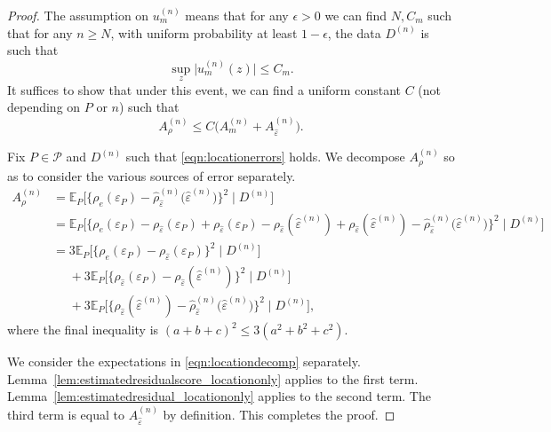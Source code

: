 \documentclass[aos]{imsart}
\newcommand{\E}{\mathbb{E}}
\begin{document}
	\begin{proof}
		The assumption on $u_m^{(n)}$ means that for any $\epsilon > 0$ we can find $N, C_m$ such that for any $n\geq N$, with uniform probability at least $1-\epsilon$, the data $D^{(n)}$ is such that \begin{equation}
			\label{eqn:locationerrors}
			\sup_{z}\big|u_m^{(n)}(z)\big| \leq C_m.
		\end{equation} 
		It suffices to show that under this event, we can find a uniform constant $C$ (not depending on $P$ or $n$) such that \begin{equation*}
			A_\rho^{(n)} \leq C\big(A_m^{(n)} + A_{\hat\varepsilon}^{(n)}\big).
		\end{equation*}
		
		Fix $P\in\mathcal{P}$ and $D^{(n)}$ such that \eqref{eqn:locationerrors} holds. We decompose $A_\rho^{(n)}$ so as to consider the various sources of error separately.
		\begin{align}
			A_\rho^{(n)} &= \E_P\Big[\big\{\rho_{e}(\varepsilon_P)-\hat \rho_{\hat\varepsilon}^{(n)}\big(\hat\varepsilon^{(n)}\big)\big\}^2 \; \Big| \; D^{(n)}\Big] \nonumber\\
			&= \E_P\Big[\big\{\rho_{e}(\varepsilon_P) - \rho_{\hat\varepsilon}(\varepsilon_P) + \rho_{\hat\varepsilon}(\varepsilon_P) - \rho_{\hat\varepsilon}(\hat\varepsilon^{(n)}) + \rho_{\hat\varepsilon}(\hat\varepsilon^{(n)}) -\hat \rho_{\hat\varepsilon}^{(n)}\big(\hat\varepsilon^{(n)}\big)\big\}^2 \; \Big| \; D^{(n)}\Big] \nonumber\\
			&= 3 \E_P\Big[\big\{\rho_{e}(\varepsilon_P)-\rho_{\hat\varepsilon}(\varepsilon_P)\big\}^2 \; \Big| \; D^{(n)}\Big] \nonumber\\
			&\phantom{=} + 3 \E_P\Big[\big\{\rho_{\hat\varepsilon}(\varepsilon_P)-\rho_{\hat\varepsilon}(\hat\varepsilon^{(n)})\big\}^2 \; \Big| \; D^{(n)}\Big]  \nonumber\\
			&\phantom{=} + 3 \E_P\Big[ \big\{  \rho_{\hat\varepsilon}(\hat\varepsilon^{(n)}) -\hat \rho_{\hat\varepsilon}^{(n)}\big(\hat\varepsilon^{(n)}\big)\big\}^2 \; \Big| \; D^{(n)} \Big] \label{eqn:locationdecomp},
		\end{align}
		where the final inequality is $(a+b+c)^2\leq 3(a^2+b^2+c^2)$.
		
		We consider the expectations in \eqref{eqn:locationdecomp} separately. Lemma~\ref{lem:estimatedresidualscore_locationonly} applies to the first term. Lemma~\ref{lem:estimatedresidual_locationonly} applies to the second term. The third term is equal to $A_{\hat\varepsilon}^{(n)}$ by definition. This completes the proof.
	\end{proof}
	
\end{document}
